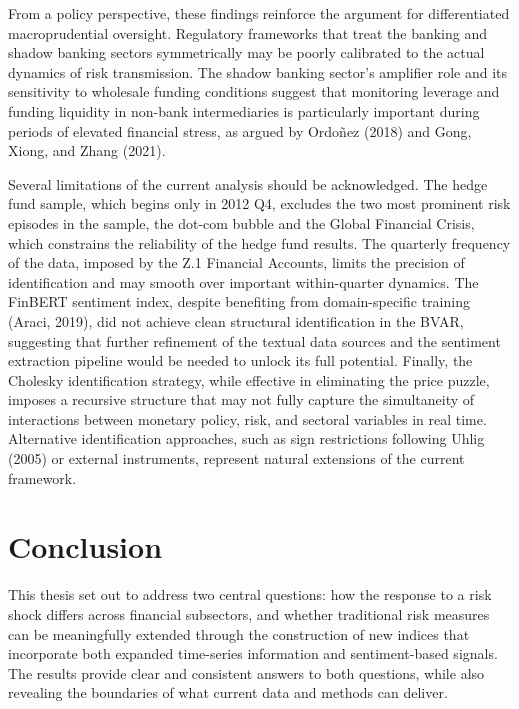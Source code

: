 \documentclass[12pt,a4paper]{report}\usepackage[a4paper, top=2.5cm, bottom=2.5cm, left=2.5cm, right=2.5cm]{geometry}
\begin{document}
From a policy perspective, these findings reinforce the argument for differentiated
macroprudential oversight. Regulatory frameworks that treat the banking and
shadow banking sectors symmetrically may be poorly calibrated to the actual
dynamics of risk transmission. The shadow banking sector's amplifier role and
its sensitivity to wholesale funding conditions suggest that monitoring leverage
and funding liquidity in non-bank intermediaries is particularly important during
periods of elevated financial stress, as argued by Ordoñez (2018) and Gong,
Xiong, and Zhang (2021).

Several limitations of the current analysis should be acknowledged. The hedge
fund sample, which begins only in 2012 Q4, excludes the two most prominent
risk episodes in the sample, the dot-com bubble and the Global Financial
Crisis, which constrains the reliability of the hedge fund results. The quarterly
frequency of the data, imposed by the Z.1 Financial Accounts, limits the
precision of identification and may smooth over important within-quarter
dynamics. The FinBERT sentiment index, despite benefiting from domain-specific
training (Araci, 2019), did not achieve clean structural identification in the
BVAR, suggesting that further refinement of the textual data sources and the
sentiment extraction pipeline would be needed to unlock its full potential.
Finally, the Cholesky identification strategy, while effective in eliminating the
price puzzle, imposes a recursive structure that may not fully capture the
simultaneity of interactions between monetary policy, risk, and sectoral variables
in real time. Alternative identification approaches, such as sign restrictions
following Uhlig (2005) or external instruments, represent natural extensions of
the current framework.

\chapter{Conclusion}

This thesis set out to address two central questions: how the response to a risk shock
differs across financial subsectors, and whether traditional risk measures can be
meaningfully extended through the construction of new indices that incorporate both
expanded time-series information and sentiment-based signals. The results provide clear
and consistent answers to both questions, while also revealing the boundaries of what
current data and methods can deliver.
\end{document}
